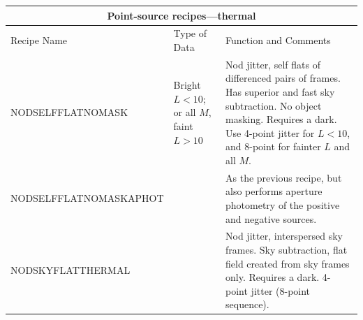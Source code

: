 \documentclass[twoside,11pt]{article}
\newcommand{\htmlref}[2]{#1}
\renewcommand{\_}{\texttt{\symbol{95}}}
\begin{document}
\begin{center}
\begin{tabular}{|l|p{25mm}|p{51mm}|}
\multicolumn{3}{c}{\large{\bf Point-source recipes---thermal}} \vspace*{1ex} \\
\hline
Recipe Name & Type of Data & Function and Comments \\ \hline
\htmlref{NOD\_SELF\_FLAT\_NO\_MASK}{NOD\_SELF\_FLAT\_NO\_MASK} &
   Bright $L<10$; or all $M$, faint $L>10$ &
   Nod jitter, self flats of differenced pairs of frames.  Has superior
   and fast sky subtraction.  No object masking.  Requires a dark.
   Use 4-point jitter for $L<10$, and 8-point for fainter $L$ and all
   $M$. \\ \hline
\htmlref{NOD\_SELF\_FLAT\_NO\_MASK\_APHOT}{NOD\_SELF\_FLAT\_NO\_MASK\_APHOT} & &
   As the previous recipe, but also performs aperture photometry of the
   positive and negative sources.  \\ \hline
\htmlref{NOD\_SKY\_FLAT\_THERMAL}{NOD\_SKY\_FLAT\_THERMAL} & &
   Nod jitter, interspersed sky frames.  Sky subtraction, flat field
   created from sky frames only.  Requires a dark.  4-point jitter (8-point
   sequence). \\ \hline
\end{tabular}
\end{center}
\end{document}
